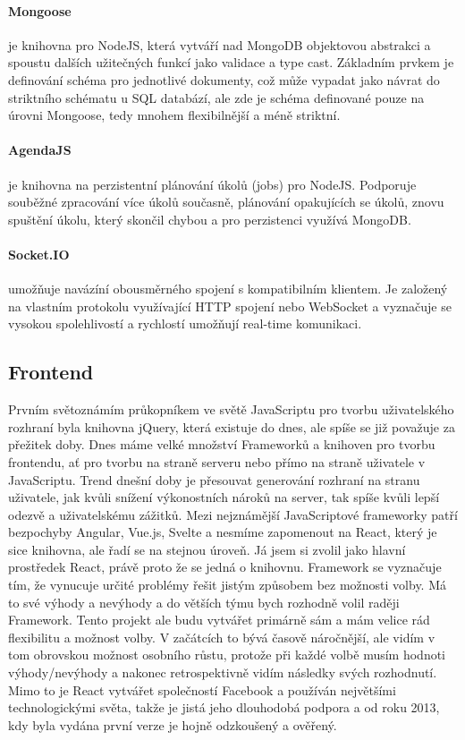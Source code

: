 \paragraph{Mongoose} je knihovna pro NodeJS, která vytváří nad MongoDB objektovou abstrakci a spoustu dalších užitečných funkcí jako validace a type cast. Základním prvkem je definování schéma pro jednotlivé dokumenty, což může vypadat jako návrat do striktního schématu u SQL databází, ale zde je schéma definované pouze na úrovni Mongoose, tedy mnohem flexibilnější a méně striktní.

\paragraph{AgendaJS} je knihovna na perzistentní plánování úkolů (jobs) pro NodeJS. Podporuje souběžné zpracování více úkolů současně, plánování opakujících se úkolů, znovu spuštění úkolu, který skončil chybou a pro perzistenci využívá MongoDB. 

\paragraph{Socket.IO} umožňuje navázíní obousměrného spojení s kompatibilním klientem. Je založený na vlastním protokolu využívající HTTP spojení nebo WebSocket a vyznačuje se vysokou spolehlivostí a rychlostí umožňují real-time komunikaci.


\subsection{Frontend}
Prvním světoznámím průkopníkem ve světě JavaScriptu pro tvorbu uživatelského rozhraní byla knihovna jQuery, která existuje do dnes, ale spíše se již považuje za přežitek doby. Dnes máme velké množství Frameworků a knihoven pro tvorbu frontendu, ať pro tvorbu na straně serveru nebo přímo na straně uživatele v JavaScriptu. Trend dnešní doby je přesouvat generování rozhraní na stranu uživatele, jak kvůli snížení výkonostních nároků na server, tak spíše kvůli lepší odezvě a uživatelskému zážitků. Mezi nejznámější JavaScriptové frameworky patří bezpochyby Angular, Vue.js, Svelte a nesmíme zapomenout na React, který je sice knihovna, ale řadí se na stejnou úroveň. Já jsem si zvolil jako hlavní prostředek React, právě proto že se jedná o knihovnu. Framework se vyznačuje tím, že vynucuje určité problémy řešit jistým způsobem bez možnosti volby. Má to své výhody a nevýhody a do větších týmu bych rozhodně volil raději Framework. Tento projekt ale budu vytvářet primárně sám a mám velice rád flexibilitu a možnost volby. V začátcích to bývá časově náročnější, ale vidím v tom obrovskou možnost osobního růstu, protože při každé volbě musím hodnoti výhody/nevýhody a nakonec retrospektivně vidím následky svých rozhodnutí. Mimo to je React vytvářet společností Facebook a používán největšími technologickými světa, takže je jistá jeho dlouhodobá podpora a od roku 2013, kdy byla vydána první verze je hojně odzkoušený a ověřený.

